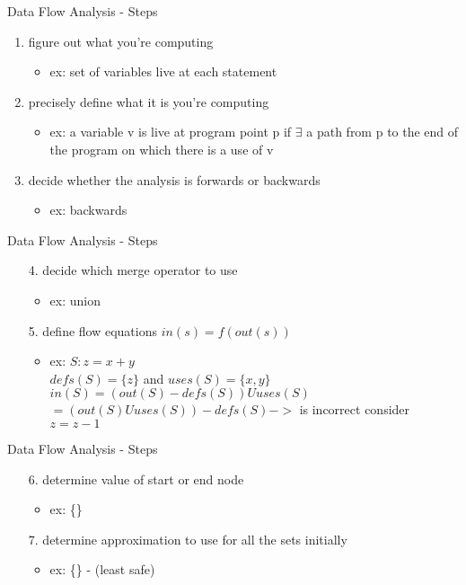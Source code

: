 \documentclass[mcgill,slideColor,colorBG,pdf]{prosper}
\begin{document}
\begin{slide} {Data Flow Analysis - Steps}
\begin{enumerate}
\item figure out what you're computing
\begin{itemize}
\item ex: set of variables live at each statement
\end{itemize}
\item precisely define what it is you're computing
\begin{itemize}
\item ex: a variable v is live at program point p if $\exists$ a path from p to the end of the program on which there is a use of v
\end{itemize}
\item decide whether the analysis is forwards or backwards
\begin{itemize}
\item ex: backwards
\end{itemize}
\end{enumerate}
\end{slide}

\begin{slide} {Data Flow Analysis - Steps}
\begin{enumerate}
\item[4.] decide which merge operator to use
\begin{itemize}
\item ex: union
\end{itemize}
\item[5.] define flow equations $in(s) = f(out(s))$
\begin{itemize}
\item ex: $S: z = x + y $\\
$defs(S) = \{z\}$ and $uses(S) = \{x, y\}$\\
$in(S) = (out(S) - defs(S)) U uses(S)$\\
       $= (out(S) U uses(S)) - defs(S) ->$ is incorrect consider $z = z - 1$  

\end{itemize}
\end{enumerate}
\end{slide}

\begin{slide} {Data Flow Analysis - Steps}
\begin{enumerate}
\item[6.] determine value of start or end node 
\begin{itemize}
\item ex: \{\}
\end{itemize}
\item[7.] determine approximation to use for all the sets initially
\begin{itemize}
\item ex: \{\} - (least safe)
\end{itemize}
\end{enumerate}
\end{slide}
\end{document}

